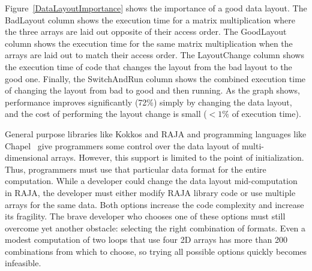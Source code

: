 \documentclass{article}
\begin{document}
Figure~\ref{DataLayoutImportance} shows the importance of a good data layout. 
The BadLayout column shows the execution time for a matrix multiplication where the three arrays are laid out opposite of their access order. 
The GoodLayout column shows the execution time for the same matrix multiplication when the arrays are laid out to match their access order.
The LayoutChange column shows the execution time of code that changes the layout from the bad layout to the good one.
Finally, the SwitchAndRun column shows the combined execution time of changing the layout from bad to good and then running.
As the graph shows, performance improves  significantly (72\%) simply by changing the data layout, and the cost of performing the layout change is small ($<1\%$ of execution time). 


General purpose libraries like Kokkos and RAJA and programming languages like Chapel~\cite{diaconescu2007approach} give programmers some control over the data layout of multi-dimensional arrays. However, this support is limited to the point of initialization.
Thus, programmers must use that particular data format for the entire computation.
While a developer could change the data layout mid-computation in RAJA, the developer must either modify RAJA library code or use multiple arrays for the same data. 
Both options increase the code complexity and increase its fragility.
The brave developer who chooses one of these options must still overcome yet another obstacle: selecting the right combination of formats.
Even a modest computation of two loops that use four 2D arrays has more than 200 combinations from which to choose, so trying all possible options quickly becomes infeasible. 
\end{document}
